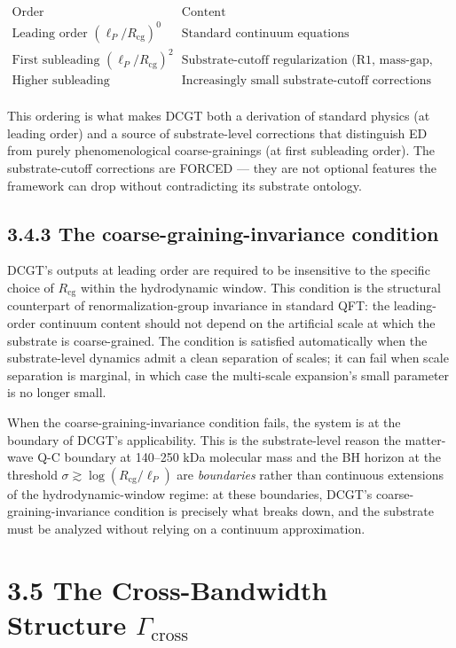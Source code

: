 \documentclass[11pt]{book}
\begin{document}
\[
\begin{array}{l|l}
\text{Order} & \text{Content} \\
\hline
\text{Leading order } (\ell_P/R_\mathrm{cg})^0 & \text{Standard continuum equations} \\
\text{First subleading } (\ell_P/R_\mathrm{cg})^2 & \text{Substrate-cutoff regularization (R1, mass-gap, etc.)} \\
\text{Higher subleading} & \text{Increasingly small substrate-cutoff corrections} \\
\end{array}
\]

This ordering is what makes DCGT both a derivation of standard physics (at leading order) and a source of substrate-level corrections that distinguish ED from purely phenomenological coarse-grainings (at first subleading order). The substrate-cutoff corrections are FORCED — they are not optional features the framework can drop without contradicting its substrate ontology.

\subsection{3.4.3 The coarse-graining-invariance condition}

DCGT's outputs at leading order are required to be insensitive to the specific choice of $R_\mathrm{cg}$ within the hydrodynamic window. This condition is the structural counterpart of renormalization-group invariance in standard QFT: the leading-order continuum content should not depend on the artificial scale at which the substrate is coarse-grained. The condition is satisfied automatically when the substrate-level dynamics admit a clean separation of scales; it can fail when scale separation is marginal, in which case the multi-scale expansion's small parameter is no longer small.

When the coarse-graining-invariance condition fails, the system is at the boundary of DCGT's applicability. This is the substrate-level reason the matter-wave Q-C boundary at 140–250 kDa molecular mass and the BH horizon at the threshold $\sigma \gtrsim \log(R_\mathrm{cg}/\ell_P)$ are \textit{boundaries} rather than continuous extensions of the hydrodynamic-window regime: at these boundaries, DCGT's coarse-graining-invariance condition is precisely what breaks down, and the substrate must be analyzed without relying on a continuum approximation.

\section{3.5 The Cross-Bandwidth Structure $\Gamma_\mathrm{cross}$}
\end{document}
